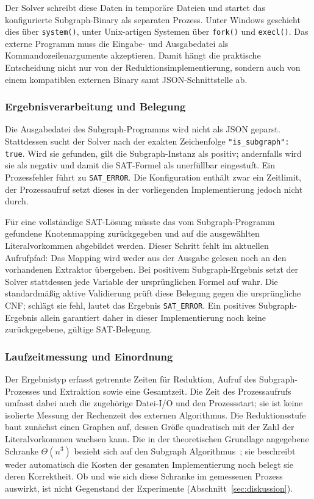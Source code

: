 \documentclass[a4paper,12pt]{article}
\theoremstyle{definition}
\begin{document}
Der Solver schreibt diese Daten in temporäre Dateien und startet das konfigurierte Subgraph-Binary als separaten Prozess. Unter Windows geschieht dies über \texttt{system()}, unter Unix-artigen Systemen über \texttt{fork()} und \texttt{execl()}. Das externe Programm muss die Eingabe- und Ausgabedatei als Kommandozeilenargumente akzeptieren. Damit hängt die praktische Entscheidung nicht nur von der Reduktionsimplementierung, sondern auch von einem kompatiblen externen Binary samt JSON-Schnittstelle ab.

\subsubsection{Ergebnisverarbeitung und Belegung}

Die Ausgabedatei des Subgraph-Programms wird nicht als JSON geparst. Stattdessen sucht der Solver nach der exakten Zeichenfolge \texttt{"is\_subgraph": true}. Wird sie gefunden, gilt die Subgraph-Instanz als positiv; andernfalls wird sie als negativ und damit die SAT-Formel als unerfüllbar eingestuft. Ein Prozessfehler führt zu \texttt{SAT\_ERROR}. Die Konfiguration enthält zwar ein Zeitlimit, der Prozessaufruf setzt dieses in der vorliegenden Implementierung jedoch nicht durch.

Für eine vollständige SAT-Lösung müsste das vom Subgraph-Programm gefundene Knotenmapping zurückgegeben und auf die ausgewählten Literalvorkommen abgebildet werden. Dieser Schritt fehlt im aktuellen Aufrufpfad: Das Mapping wird weder aus der Ausgabe gelesen noch an den vorhandenen Extraktor übergeben. Bei positivem Subgraph-Ergebnis setzt der Solver stattdessen jede Variable der ursprünglichen Formel auf wahr. Die standardmäßig aktive Validierung prüft diese Belegung gegen die ursprüngliche CNF; schlägt sie fehl, lautet das Ergebnis \texttt{SAT\_ERROR}. Ein positives Subgraph-Ergebnis allein garantiert daher in dieser Implementierung noch keine zurückgegebene, gültige SAT-Belegung.

\subsubsection{Laufzeitmessung und Einordnung}

Der Ergebnistyp erfasst getrennte Zeiten für Reduktion, Aufruf des Subgraph-Prozesses und Extraktion sowie eine Gesamtzeit. Die Zeit des Prozessaufrufs umfasst dabei auch die zugehörige Datei-I/O und den Prozessstart; sie ist keine isolierte Messung der Rechenzeit des externen Algorithmus. Die Reduktionsstufe baut zunächst einen Graphen auf, dessen Größe quadratisch mit der Zahl der Literalvorkommen wachsen kann. Die in der theoretischen Grundlage angegebene Schranke $\Theta(n^3)$ bezieht sich auf den Subgraph Algorithmus~\cite{epp-subgraph}; sie beschreibt weder automatisch die Kosten der gesamten Implementierung noch belegt sie deren Korrektheit. Ob und wie sich diese Schranke im gemessenen Prozess auswirkt, ist nicht Gegenstand der Experimente (Abschnitt~\ref{sec:diskussion}).
\end{document}

